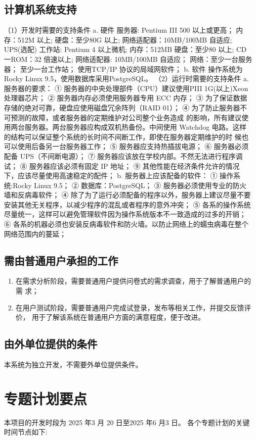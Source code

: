 \documentclass[
    report,     %
    oneside,    %
    UTF8,       %
    zihao=-4    %
]{config} %
\begin{document}
\subsection{计算机系统支持}
（1）开发时需要的支持条件
a. 硬件
服务器: Pentium III 500 以上或更高；
内存：512M 以上;
硬盘：至少80G 以上;
网络适配器：10MB/100MB 自适应;
UPS(选配)
工作站: Pentium 4 以上微机;
内存：512MB
硬盘：至少80 以上;
CD一ROM：32 倍速以上;
网络适配器: 10MB/100MB 自适应；
网络：至少一台服务器；
至少一台工作站；
使用TCP/IP 协议的局域网软件；
b. 软件
操作系统为Rocky Linux 9.5，使用数据库采用PostgreSQL。
（2）运行时需要的支持条件
a. 服务器的要求：
① 服务器的中央处理部件（CPU）建议使用PIII 1G(以上)Xeon 处理器芯片；
② 服务器内存必须使用服务器专用 ECC 内存；
③ 为了保证数据存储的绝对可靠，硬盘应使用磁盘冗余阵列（RAID 01）；
④ 为了防止服务器不可预测的故障，或者服务器的定期维护对公司整个业务造成
的影响，所有建议使用两台服务器。两台服务器应构成双机热备份。中间使用 Watchdog
电路。这样的结构可以保证整个系统的长时间不间断工作，即使在服务器定期维护的时
候也可以使用后备另一台服务器工作；
⑤ 服务器应支持热插拔电源；
⑥ 服务器必须配备 UPS（不间断电源）；
⑦ 服务器应该放在学校内部。不然无法进行程序调试；
⑧ 服务器应该必须有固定 IP 地址；
⑨ 其他性能在经济条件允许的情况下，应该尽量使用高速稳定的配件；
b. 服务器上应该配备的软件：
① 操作系统:Rocky Linux 9.5；
② 数据库：PostgreSQL；
③ 服务器必须使用专业的防火墙和反病毒软件；
④ 除了为了运行必须配备的程序以外，服务器上建议尽量不要安装其他无关程序，以减少程序的混乱或者程序的意外冲突；
⑤ 各系的操作系统尽量统一，这样可以避免管理软件因为操作系统版本不一致造成的过多的开销；
⑥ 各系的机器必须也安装反病毒软件和防火墙。以防止网络上的蠕虫病毒在整个网络范围内的蔓延；
\subsection{需由普通用户承担的工作}
\begin{enumerate}[label=(\arabic*)]
\item 在需求分析阶段，需要普通用户提供问卷式的需求调查，用于了解普通用户的需
求；
\item 在用户测试阶段，需要普通用户完成试登录，发布等相关工作，并提交反馈评价，
用于了解该系统在普通用户方面的满意程度，便于改进。
\end{enumerate}
\subsection{由外单位提供的条件}
本系统为独立开发，不需要外单位提供条件。
\section{专题计划要点}
本项目的开发时段为 2025 年3 月 20 日至2025 年6 月3 日。
各个专题计划的关键时间节点如下:
\end{document}
